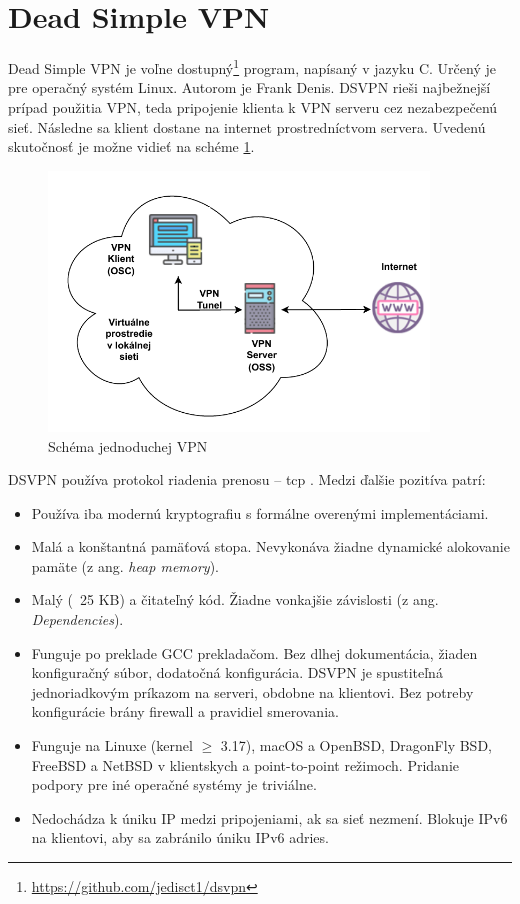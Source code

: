 \section{Dead Simple VPN}\label{dsvpn}
Dead Simple VPN je voľne dostupný\footnote{\href{https://github.com/jedisct1/dsvpn}{https://github.com/jedisct1/dsvpn}} program, napísaný v jazyku C. Určený je pre operačný systém Linux. Autorom je Frank Denis. DSVPN rieši najbežnejší prípad použitia VPN, teda pripojenie klienta k VPN serveru cez nezabezpečenú sieť. Následne sa klient dostane na internet prostredníctvom servera. Uvedenú skutočnosť je možne vidieť na schéme \ref{vpnsimple}.
\begin{figure}
	\centering
	\includegraphics[width=0.9\textwidth]{figures/vpnsimple}
	\caption{Schéma jednoduchej VPN}
	\label{vpnsimple}
\end{figure}

DSVPN používa protokol riadenia prenosu -- \acrshort{tcp} \cite{tcp}. Medzi ďalšie pozitíva patrí:
\begin{itemize}
	\item{Používa iba modernú kryptografiu s formálne overenými implementáciami.}
	\item{Malá a konštantná pamäťová stopa. Nevykonáva žiadne dynamické alokovanie pamäte (z ang. \textit{heap memory}).}
	\item{Malý (~25 KB) a čitateľný kód. Žiadne vonkajšie závislosti (z ang. \textit{Dependencies}).}
	\item{Funguje po preklade GCC prekladačom. Bez dlhej dokumentácia, žiaden konfiguračný súbor, dodatočná konfigurácia. DSVPN je spustiteľná jednoriadkovým príkazom na serveri, obdobne na klientovi. Bez potreby konfigurácie brány firewall a pravidiel smerovania.}
	\item{Funguje na Linuxe (kernel $\geq$ 3.17), macOS a OpenBSD, DragonFly BSD, FreeBSD a NetBSD v klientskych a point-to-point režimoch. Pridanie podpory pre iné operačné systémy je triviálne.}
	\item{Nedochádza k úniku IP medzi pripojeniami, ak sa sieť nezmení. Blokuje IPv6 na klientovi, aby sa zabránilo úniku IPv6 adries.}
\end{itemize} 

